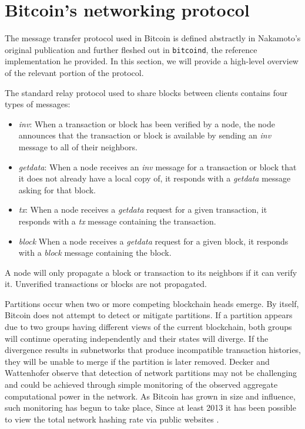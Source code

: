 \section{Bitcoin's networking protocol}
The message transfer protocol used in Bitcoin is defined abstractly in Nakamoto's original publication \cite{Nakamoto} and further fleshed out in \texttt{bitcoind}, the reference implementation he provided. In this section, we will provide a high-level overview of the relevant portion of the protocol. %

The standard relay protocol used to share blocks between clients contains four types of messages:

\begin{itemize}

\item \textit{inv}: When a transaction or block has been verified by a node, the node announces that the transaction or block is available by sending an \textit{inv} message to all of their neighbors.
\item \textit{getdata}: When a node receives an \textit{inv} message for a transaction or block that it does not already have a local copy of, it responds with a \textit{getdata} message asking for that block.
\item \textit{tx}: When a node receives a \textit{getdata} request for a given transaction, it responds with a \textit{tx} message containing the transaction.
\item \textit{block} When a node receives a \textit{getdata} request for a given block, it responds with a \textit{block} message containing the block.

\end{itemize}

A node will only propagate a block or transaction to its neighbors if it can verify it. Unverified transactions or blocks are not propagated. %

Partitions occur when two or more competing blockchain heads emerge. 
By itself, Bitcoin does not attempt to detect or mitigate partitions. If a partition appears due to two groups having different views of the current blockchain, both groups will continue operating independently and their states will diverge. If the divergence results in subnetworks that produce incompatible transaction histories, they will be unable to merge if the partition is later removed. Decker and Wattenhofer \cite{DeckerWattenhofer2013} observe that detection of network partitions may not be challenging and could be achieved through simple monitoring of the observed aggregate computational power in the network. As Bitcoin has grown in size and influence, such monitoring has begun to take place, Since at least 2013 it has been possible to view the total network hashing rate via public websites \cite{sipa}.



